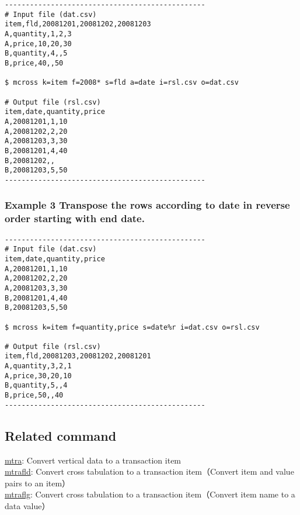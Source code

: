\documentclass[a4paper]{jarticle}
\begin{document}
\begin{verbatim}
------------------------------------------------
# Input file (dat.csv)
item,fld,20081201,20081202,20081203
A,quantity,1,2,3
A,price,10,20,30
B,quantity,4,,5
B,price,40,,50

$ mcross k=item f=2008* s=fld a=date i=rsl.csv o=dat.csv

# Output file (rsl.csv)
item,date,quantity,price
A,20081201,1,10
A,20081202,2,20
A,20081203,3,30
B,20081201,4,40
B,20081202,,
B,20081203,5,50
------------------------------------------------
\end{verbatim}

\subsubsection*{Example 3 Transpose the rows according to date in reverse order starting with end date. 
}

\begin{verbatim}
------------------------------------------------
# Input file (dat.csv)
item,date,quantity,price
A,20081201,1,10
A,20081202,2,20
A,20081203,3,30
B,20081201,4,40
B,20081203,5,50

$ mcross k=item f=quantity,price s=date%r i=dat.csv o=rsl.csv

# Output file (rsl.csv)
item,fld,20081203,20081202,20081201
A,quantity,3,2,1
A,price,30,20,10
B,quantity,5,,4
B,price,50,,40
------------------------------------------------
\end{verbatim}

\subsection*{Related command}
\noindent
\href{run:mtra.pdf}{mtra}: Convert vertical data to a transaction item\\
\href{run:mtrafld.pdf}{mtrafld}: Convert cross tabulation to a transaction item（Convert item and value pairs to an item）\\
\href{run:mtraflg.pdf}{mtraflg}: Convert cross tabulation to a transaction item（Convert item name to a data value）\\
\end{document}
